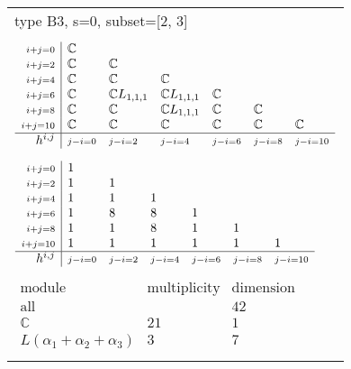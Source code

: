 \documentclass[crop,border=2mm]{standalone}
\begin{document}
\begin{tabular}{l}
{\huge type B3, s=0, subset=[2, 3]}\\ \\


$\displaystyle
\begin{array}{r|l l l l l l}
	{\scriptstyle i+j=0}&\mathbb{C}&&&&&\\
	{\scriptstyle i+j=2}&\mathbb{C}&\mathbb{C}&&&&\\
	{\scriptstyle i+j=4}&\mathbb{C}&\mathbb{C}&\mathbb{C}&&&\\
	{\scriptstyle i+j=6}&\mathbb{C}&\mathbb{C}L_{1,1,1}&\mathbb{C}L_{1,1,1}&\mathbb{C}&&\\
	{\scriptstyle i+j=8}&\mathbb{C}&\mathbb{C}&\mathbb{C}L_{1,1,1}&\mathbb{C}&\mathbb{C}&\\
	{\scriptstyle i+j=10}&\mathbb{C}&\mathbb{C}&\mathbb{C}&\mathbb{C}&\mathbb{C}&\mathbb{C}\\
	\hline h^{i,j}&{\scriptstyle j-i=0}&{\scriptstyle j-i=2}&{\scriptstyle j-i=4}&{\scriptstyle j-i=6}&{\scriptstyle j-i=8}&{\scriptstyle j-i=10}
\end{array}
$ \\ \\


$\displaystyle
\begin{array}{r|l l l l l l}
	{\scriptstyle i+j=0}&1&&&&&\\
	{\scriptstyle i+j=2}&1&1&&&&\\
	{\scriptstyle i+j=4}&1&1&1&&&\\
	{\scriptstyle i+j=6}&1&8&8&1&&\\
	{\scriptstyle i+j=8}&1&1&8&1&1&\\
	{\scriptstyle i+j=10}&1&1&1&1&1&1\\
	\hline h^{i,j}&{\scriptstyle j-i=0}&{\scriptstyle j-i=2}&{\scriptstyle j-i=4}&{\scriptstyle j-i=6}&{\scriptstyle j-i=8}&{\scriptstyle j-i=10}
\end{array}
$ \\ \\


$\displaystyle
\begin{array}{rll}
	\text{module}&\text{multiplicity}&\text{dimension} \\ \hline \text{all}&&42 \\
	\mathbb{C}&21&1\\
	L\left(\alpha_{1}+\alpha_{2}+\alpha_{3}\right)&3&7
\end{array}
$ \\ \\

\end{tabular}
\end{document}
